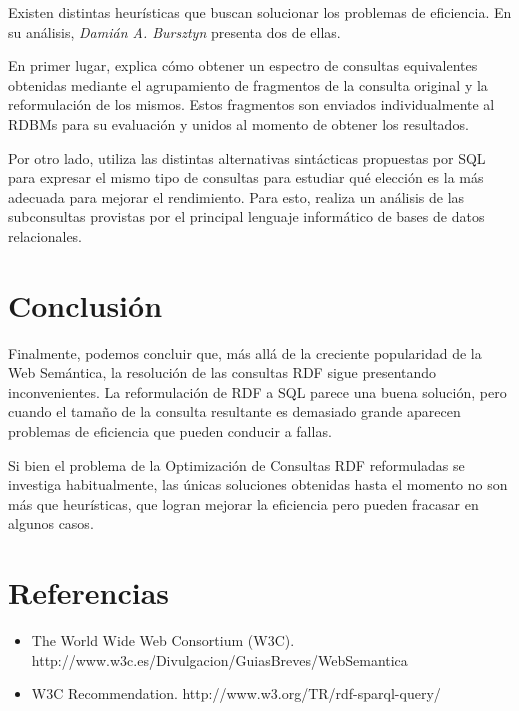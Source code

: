 \documentclass[10pt,a4paper]{article}
\begin{document}
Existen distintas heurísticas que buscan solucionar los problemas de eficiencia. En su análisis, \textit{Damián A. Bursztyn} presenta dos de ellas.

En primer lugar, explica cómo obtener un espectro de consultas equivalentes obtenidas mediante el agrupamiento de fragmentos de la consulta original y la reformulación de los mismos. Estos fragmentos son enviados individualmente al RDBMs para su evaluación y unidos al momento de obtener los resultados.

Por otro lado, utiliza las distintas alternativas sintácticas propuestas por SQL para expresar el mismo tipo de consultas para estudiar qué elección es la más adecuada para mejorar el rendimiento. Para esto, realiza un análisis de las subconsultas provistas por el principal lenguaje informático de bases de datos relacionales.

\section{Conclusión}
Finalmente, podemos concluir que, más allá de la creciente popularidad de la Web Semántica, la resolución de las consultas RDF sigue presentando inconvenientes. La reformulación de RDF a SQL parece una buena solución, pero cuando el tamaño de la consulta resultante es demasiado grande aparecen problemas de eficiencia que pueden conducir a fallas. 

Si bien el problema de la Optimización de Consultas RDF reformuladas se investiga habitualmente, las únicas soluciones obtenidas hasta el momento no son más que heurísticas, que logran mejorar la eficiencia pero pueden fracasar en algunos casos.

\section{Referencias}

\begin{itemize}
\item The World Wide Web Consortium (W3C). http://www.w3c.es/Divulgacion/GuiasBreves/WebSemantica
\item W3C Recommendation. http://www.w3.org/TR/rdf-sparql-query/
\end{itemize}
\end{document}
